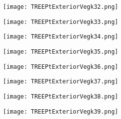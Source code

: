\documentclass[pdf]{beamer}
\begin{document}
\begin{frame}
\begin{figure}[!h]
\centering
\texttt{[image: TREEPtExteriorVegk32.png]}
\end{figure}
\end{frame}

\begin{frame}
\begin{figure}[!h]
\centering
\texttt{[image: TREEPtExteriorVegk33.png]}
\end{figure}
\end{frame}

\begin{frame}
\begin{figure}[!h]
\centering
\texttt{[image: TREEPtExteriorVegk34.png]}
\end{figure}
\end{frame}

\begin{frame}
\begin{figure}[!h]
\centering
\texttt{[image: TREEPtExteriorVegk35.png]}
\end{figure}
\end{frame}

\begin{frame}
\begin{figure}[!h]
\centering
\texttt{[image: TREEPtExteriorVegk36.png]}
\end{figure}
\end{frame}

\begin{frame}
\begin{figure}[!h]
\centering
\texttt{[image: TREEPtExteriorVegk37.png]}
\end{figure}
\end{frame}

\begin{frame}
\begin{figure}[!h]
\centering
\texttt{[image: TREEPtExteriorVegk38.png]}
\end{figure}
\end{frame}

\begin{frame}
\begin{figure}[!h]
\centering
\texttt{[image: TREEPtExteriorVegk39.png]}
\end{figure}
\end{frame}
\end{document}
